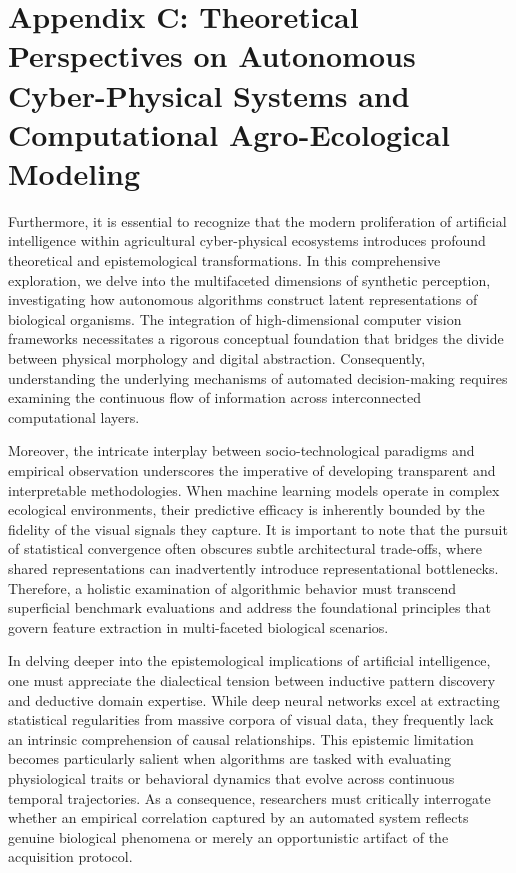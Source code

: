 \documentclass[Times,12pt,oneside,openany,print,index]{report}
\begin{document}
\setcounter{page}{27}
\chapter*{Appendix C: Theoretical Perspectives on Autonomous Cyber-Physical Systems and Computational Agro-Ecological Modeling}

Furthermore, it is essential to recognize that the modern proliferation of artificial intelligence within agricultural cyber-physical ecosystems introduces profound theoretical and epistemological transformations. In this comprehensive exploration, we delve into the multifaceted dimensions of synthetic perception, investigating how autonomous algorithms construct latent representations of biological organisms. The integration of high-dimensional computer vision frameworks necessitates a rigorous conceptual foundation that bridges the divide between physical morphology and digital abstraction. Consequently, understanding the underlying mechanisms of automated decision-making requires examining the continuous flow of information across interconnected computational layers.

Moreover, the intricate interplay between socio-technological paradigms and empirical observation underscores the imperative of developing transparent and interpretable methodologies. When machine learning models operate in complex ecological environments, their predictive efficacy is inherently bounded by the fidelity of the visual signals they capture. It is important to note that the pursuit of statistical convergence often obscures subtle architectural trade-offs, where shared representations can inadvertently introduce representational bottlenecks. Therefore, a holistic examination of algorithmic behavior must transcend superficial benchmark evaluations and address the foundational principles that govern feature extraction in multi-faceted biological scenarios.

In delving deeper into the epistemological implications of artificial intelligence, one must appreciate the dialectical tension between inductive pattern discovery and deductive domain expertise. While deep neural networks excel at extracting statistical regularities from massive corpora of visual data, they frequently lack an intrinsic comprehension of causal relationships. This epistemic limitation becomes particularly salient when algorithms are tasked with evaluating physiological traits or behavioral dynamics that evolve across continuous temporal trajectories. As a consequence, researchers must critically interrogate whether an empirical correlation captured by an automated system reflects genuine biological phenomena or merely an opportunistic artifact of the acquisition protocol.
\end{document}

